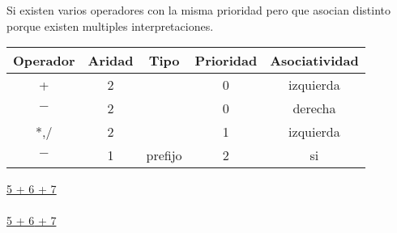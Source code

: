\documentclass[\main/ApuntesPL.tex]{subfiles}
\begin{document}
      \par
      Si existen varios operadores con la misma prioridad pero que asocian distinto porque existen
      multiples interpretaciones.
      \begin{center}
        \begin{minipage}{.65\textwidth}
          \begin{tabular}{||c c c c c||}
            \hline
            Operador & Aridad & Tipo & Prioridad & Asociatividad \\ [0.5ex]
            \hline\hline
            + & 2 &  & 0 & izquierda \\
            \hline
            $-$ & 2 &  & 0 & derecha \\
            \hline
            *,/ & 2 &  & 1 & izquierda \\
            \hline
            $-$ & 1 & prefijo & 2 & si \\ [1ex]
            \hline
          \end{tabular}
        \end{minipage}%
        \begin{minipage}{.35\textwidth}
          \hspace*{10mm}\underline{5 + \underline{6 + 7}}\\\\
          \hspace*{10mm}\underline{\underline{5 + 6} + 7}
        \end{minipage}
      \end{center}
\end{document}
